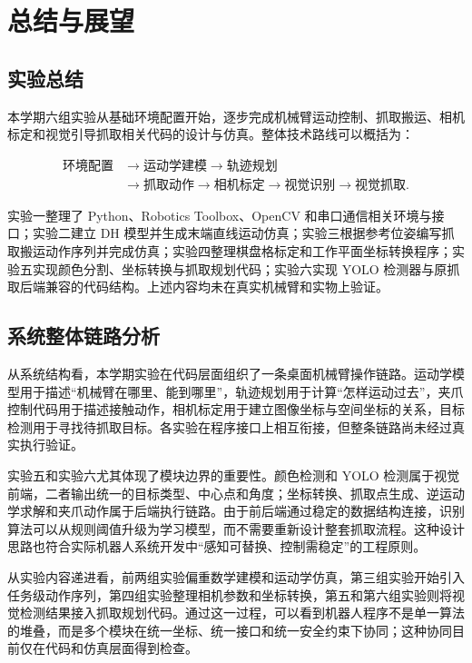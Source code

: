 \section{总结与展望}

\subsection{实验总结}

本学期六组实验从基础环境配置开始，逐步完成机械臂运动控制、抓取搬运、相机标定和视觉引导抓取相关代码的设计与仿真。整体技术路线可以概括为：

\[
\begin{aligned}
\text{环境配置}&\rightarrow \text{运动学建模}\rightarrow \text{轨迹规划}\\
&\rightarrow \text{抓取动作}\rightarrow \text{相机标定}
\rightarrow \text{视觉识别}\rightarrow \text{视觉抓取}.
\end{aligned}
\]

实验一整理了 Python、Robotics Toolbox、OpenCV 和串口通信相关环境与接口；实验二建立 DH 模型并生成末端直线运动仿真；实验三根据参考位姿编写抓取搬运动作序列并完成仿真；实验四整理棋盘格标定和工作平面坐标转换程序；实验五实现颜色分割、坐标转换与抓取规划代码；实验六实现 YOLO 检测器与原抓取后端兼容的代码结构。上述内容均未在真实机械臂和实物上验证。

\subsection{系统整体链路分析}

从系统结构看，本学期实验在代码层面组织了一条桌面机械臂操作链路。运动学模型用于描述“机械臂在哪里、能到哪里”，轨迹规划用于计算“怎样运动过去”，夹爪控制代码用于描述接触动作，相机标定用于建立图像坐标与空间坐标的关系，目标检测用于寻找待抓取目标。各实验在程序接口上相互衔接，但整条链路尚未经过真实执行验证。

实验五和实验六尤其体现了模块边界的重要性。颜色检测和 YOLO 检测属于视觉前端，二者输出统一的目标类型、中心点和角度；坐标转换、抓取点生成、逆运动学求解和夹爪动作属于后端执行链路。由于前后端通过稳定的数据结构连接，识别算法可以从规则阈值升级为学习模型，而不需要重新设计整套抓取流程。这种设计思路也符合实际机器人系统开发中“感知可替换、控制需稳定”的工程原则。

从实验内容递进看，前两组实验偏重数学建模和运动学仿真，第三组实验开始引入任务级动作序列，第四组实验整理相机参数和坐标转换，第五和第六组实验则将视觉检测结果接入抓取规划代码。通过这一过程，可以看到机器人程序不是单一算法的堆叠，而是多个模块在统一坐标、统一接口和统一安全约束下协同；这种协同目前仅在代码和仿真层面得到检查。

